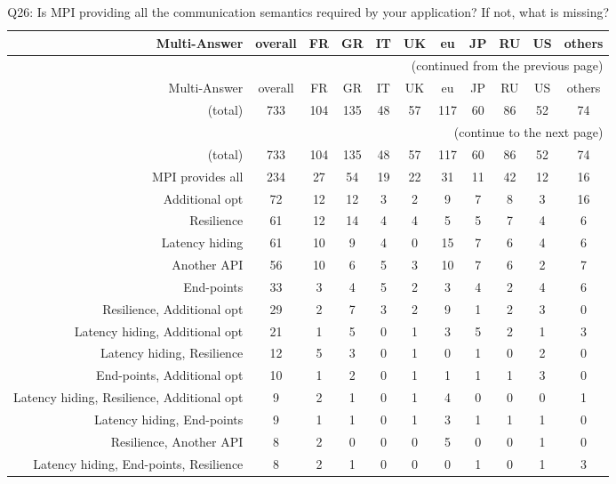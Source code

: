 \clearpage%
{\footnotesize\begin{landscape}%
\begin{longtable}[htb]{r|c|c|c|c|c|c|c|c|c|c}%
\caption{Q26: Is MPI providing all the communication semantics required by your application? If not, what is missing?}%
\label{tab:Q26-mans} \\%
\hline%
Multi-Answer & overall & FR & GR & IT & UK & eu & JP & RU & US & others \\
 \hline%
\endfirsthead%
\multicolumn{11}{r}{(continued from the previous page)}\\%
\hline%
Multi-Answer & overall & FR & GR & IT & UK & eu & JP & RU & US & others \\
 \hline%
\endhead%
\hline%
(total) & 733 & 104 & 135 & 48 & 57 & 117 & 60 & 86 & 52 & 74 \\%
\hline%
\multicolumn{11}{r}{(continue to the next page)}\\%
\endfoot%
\hline%
(total) & 733 & 104 & 135 & 48 & 57 & 117 & 60 & 86 & 52 & 74 \\%
\hline%
\endlastfoot%
\hline%
{MPI provides all} & 234 & 27 & 54 & 19 & 22 & 31 & 11 & 42 & 12 & 16 \\%
{Additional opt} & 72 & 12 & 12 & 3 & 2 & 9 & 7 & 8 & 3 & 16 \\%
{Resilience} & 61 & 12 & 14 & 4 & 4 & 5 & 5 & 7 & 4 & 6 \\%
{Latency hiding} & 61 & 10 & 9 & 4 & 0 & 15 & 7 & 6 & 4 & 6 \\%
{Another API} & 56 & 10 & 6 & 5 & 3 & 10 & 7 & 6 & 2 & 7 \\%
{End-points} & 33 & 3 & 4 & 5 & 2 & 3 & 4 & 2 & 4 & 6 \\%
{Resilience, Additional opt} & 29 & 2 & 7 & 3 & 2 & 9 & 1 & 2 & 3 & 0 \\%
{Latency hiding, Additional opt} & 21 & 1 & 5 & 0 & 1 & 3 & 5 & 2 & 1 & 3 \\%
{Latency hiding, Resilience} & 12 & 5 & 3 & 0 & 1 & 0 & 1 & 0 & 2 & 0 \\%
{End-points, Additional opt} & 10 & 1 & 2 & 0 & 1 & 1 & 1 & 1 & 3 & 0 \\%
{Latency hiding, Resilience, Additional opt} & 9 & 2 & 1 & 0 & 1 & 4 & 0 & 0 & 0 & 1 \\%
{Latency hiding, End-points} & 9 & 1 & 1 & 0 & 1 & 3 & 1 & 1 & 1 & 0 \\%
{Resilience, Another API} & 8 & 2 & 0 & 0 & 0 & 5 & 0 & 0 & 1 & 0 \\%
{Latency hiding, End-points, Resilience} & 8 & 2 & 1 & 0 & 0 & 0 & 1 & 0 & 1 & 3 \\%

\end{longtable}
\end{landscape}}
